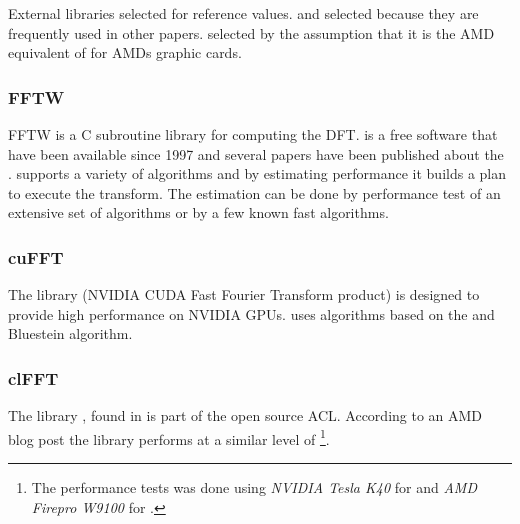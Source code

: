 External libraries selected for reference values. {\FFTW} and {\CUFFT} selected because they are frequently used in other papers. {\CLFFT} selected by the assumption that it is the AMD equivalent of {\CUFFT} for AMDs graphic cards.

\subsubsection{FFTW}

\gls{FFTW} is a C subroutine library for computing the \gls{DFT}. {\FFTW} is a free software\cite{fftw2015} that have been available since 1997 and several papers have been published about the {\FFTW}\cite{frigo1999fast,frigo1998fftw,frigo2005design}. {\FFTW} supports a variety of algorithms and by estimating performance it builds a plan to execute the transform. The estimation can be done by performance test of an extensive set of algorithms or by a few known fast algorithms.

\subsubsection{cuFFT}

The library {\CUFFT} (NVIDIA CUDA Fast Fourier Transform product)\cite{nvidia2013userguide} is designed to provide high performance on NVIDIA \gls{GPU}s. {\CUFFT} uses algorithms based on the {\CTALG} and Bluestein algorithm\cite{bluestein1970linear}.

\subsubsection{clFFT}

The library {\CLFFT}, found in\cite{githubclfft} is part of the open source \gls{ACL}\cite{amdacl}. According to an AMD blog post\cite{amd2015performance} the library performs at a similar level of {\CUFFT}\footnote{The performance tests was done using \emph{NVIDIA Tesla K40} for {\CUFFT} and \emph{AMD Firepro W9100} for {\CLFFT}.}.